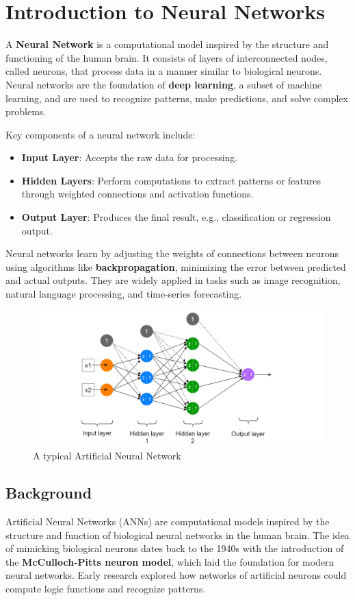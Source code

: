 \chapter{Introduction to Neural Networks}\label{chp:1}
A \textbf{Neural Network} is a computational model inspired by the structure and functioning of the human brain. It consists of layers of interconnected nodes, called neurons, that process data in a manner similar to biological neurons. Neural networks are the foundation of \textbf{deep learning}, a subset of machine learning, and are used to recognize patterns, make predictions, and solve complex problems.

Key components of a neural network include:
\begin{itemize}
    \item \textbf{Input Layer}: Accepts the raw data for processing.
    \item \textbf{Hidden Layers}: Perform computations to extract patterns or features through weighted connections and activation functions.
    \item \textbf{Output Layer}: Produces the final result, e.g., classification or regression output.
\end{itemize}

Neural networks learn by adjusting the weights of connections between neurons using algorithms like \textbf{backpropagation}, minimizing the error between predicted and actual outputs. They are widely applied in tasks such as image recognition, natural language processing, and time-series forecasting.

\begin{figure}[h!]
    \centering
    \includegraphics[width=\textwidth]{images/figure1.png}
    \caption{A typical Artificial Neural Network}
    \label{fig:1}
\end{figure}

\section{Background}
Artificial Neural Networks (ANNs) are computational models inspired by the structure and function of biological neural networks in the human brain. The idea of mimicking biological neurons dates back to the 1940s with the introduction of the \textbf{McCulloch-Pitts neuron model}, which laid the foundation for modern neural networks.\cite{mcculloch1943logical} Early research explored how networks of artificial neurons could compute logic functions and recognize patterns.\\

